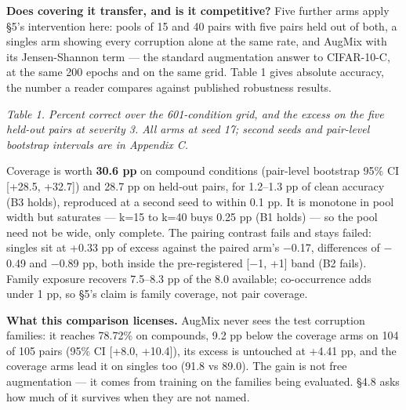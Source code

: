 \textbf{Does covering it transfer, and is it competitive?} Five further arms apply §5's intervention here: pools of 15 and 40 pairs with five pairs held out of both, a singles arm showing every corruption alone at the same rate, and AugMix \cite{hendrycks2020augmix} with its Jensen-Shannon term --- the standard augmentation answer to CIFAR-10-C, at the same 200 epochs and on the same grid. Table 1 gives absolute accuracy, the number a reader compares against published robustness results.

\noindent{}
\emph{Table 1. Percent correct over the 601-condition grid, and the excess on the five held-out pairs at severity 3. All arms at seed 17; second seeds and pair-level bootstrap intervals are in Appendix C.}

Coverage is worth \textbf{30.6 pp} on compound conditions (pair-level bootstrap 95\% CI [+28.5, +32.7]) and 28.7 pp on held-out pairs, for 1.2--1.3 pp of clean accuracy (B3 holds), reproduced at a second seed to within 0.1 pp. It is monotone in pool width but saturates --- k=15 to k=40 buys 0.25 pp (B1 holds) --- so the pool need not be wide, only complete. The pairing contrast fails and stays failed: singles sit at +0.33 pp of excess against the paired arm's $-$0.17, differences of $-$0.49 and $-$0.89 pp, both inside the pre-registered [$-$1, +1] band (B2 fails). Family exposure recovers 7.5--8.3 pp of the 8.0 available; co-occurrence adds under 1 pp, so §5's claim is family coverage, not pair coverage.

\textbf{What this comparison licenses.} AugMix never sees the test corruption families: it reaches 78.72\% on compounds, 9.2 pp below the coverage arms on 104 of 105 pairs (95\% CI [+8.0, +10.4]), its excess is untouched at +4.41 pp, and the coverage arms lead it on singles too (91.8 vs 89.0). The gain is not free augmentation --- it comes from training on the families being evaluated. §4.8 asks how much of it survives when they are not named.

